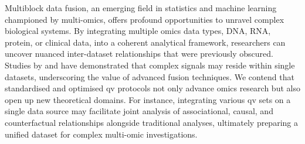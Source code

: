 %
%

Multiblock data fusion, an emerging field in statistics and machine learning championed by multi-omics, offers profound opportunities to unravel complex biological systems. By integrating multiple omics data types, DNA, RNA, protein, or clinical data, into a coherent analytical framework, researchers can uncover nuanced inter-dataset relationships that were previously obscured. Studies by \citet{kong2018nature} and \citet{howe2021within} have demonstrated that complex signals may reside within single datasets, underscoring the value of advanced fusion techniques. We contend that standardised and optimised \ac{qv} protocols not only advance omics research but also open up new theoretical domains. For instance, integrating various \ac{qv} sets on a single data source may facilitate joint analysis of associational, causal, and counterfactual relationships alongside traditional analyses, ultimately preparing a unified dataset for complex multi-omic investigations.

